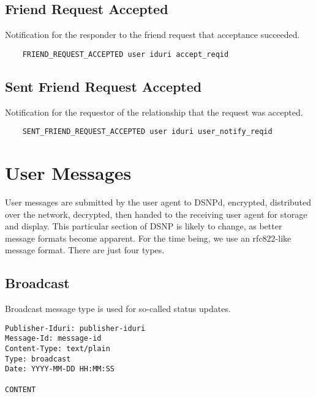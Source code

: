 \documentclass[letterpaper,11pt,oneside]{article}
\begin{document}
\subsection{Friend Request Accepted}

Notification for the responder to the friend request that acceptance succeeded.

\vspace{10pt}
\begin{verbatim}
    FRIEND_REQUEST_ACCEPTED user iduri accept_reqid
\end{verbatim}
\vspace{10pt}

\subsection{Sent Friend Request Accepted}

Notification for the requestor of the relationship that the request was
accepted.

\vspace{10pt}
\begin{verbatim}
    SENT_FRIEND_REQUEST_ACCEPTED user iduri user_notify_reqid
\end{verbatim}
\vspace{10pt}

\section{User Messages}

User messages are submitted by the user agent to DSNPd, encrypted, distributed
over the network, decrypted, then handed to the receiving user agent for
storage and display. This particular section of DSNP is likely to change, as
better message formats become apparent. For the time being, we use an
rfc822-like message format. There are just four types.

\subsection{Broadcast}

Broadcast message type is used for so-called status updates.

\vspace{10pt}
\begin{verbatim}
Publisher-Iduri: publisher-iduri
Message-Id: message-id
Content-Type: text/plain
Type: broadcast
Date: YYYY-MM-DD HH:MM:SS

CONTENT
\end{verbatim}
\vspace{10pt}
\end{document}
